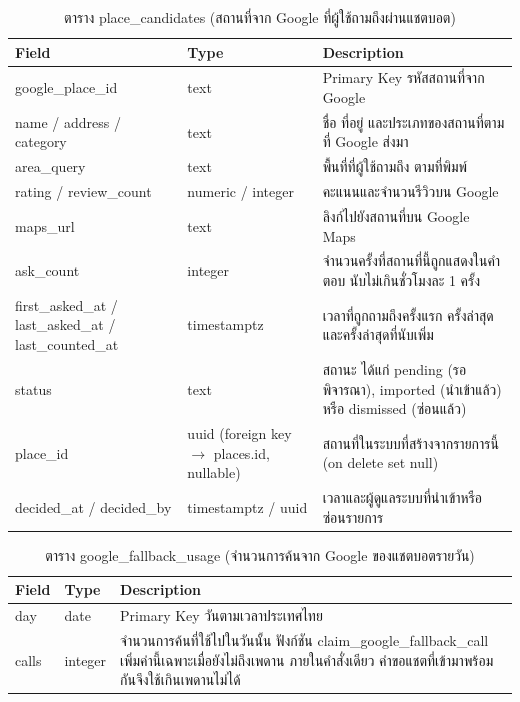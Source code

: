 \begin{table}[H]
\centering
\caption{ตาราง place\_candidates (สถานที่จาก Google ที่ผู้ใช้ถามถึงผ่านแชตบอต)}
\label{tab:db_candidates}
\begin{tabular}{|p{3.6cm}|p{2.6cm}|p{6.8cm}|}
\hline
\textbf{Field} & \textbf{Type} & \textbf{Description} \\
\hline
google\_place\_id & text & Primary Key รหัสสถานที่จาก Google \\ \hline
name / address / category & text & ชื่อ ที่อยู่ และประเภทของสถานที่ตามที่ Google ส่งมา \\ \hline
area\_query & text & พื้นที่ที่ผู้ใช้ถามถึง ตามที่พิมพ์ \\ \hline
rating / review\_count & numeric / integer & คะแนนและจำนวนรีวิวบน Google \\ \hline
maps\_url & text & ลิงก์ไปยังสถานที่บน Google Maps \\ \hline
ask\_count & integer & จำนวนครั้งที่สถานที่นี้ถูกแสดงในคำตอบ นับไม่เกินชั่วโมงละ 1 ครั้ง \\ \hline
first\_asked\_at / last\_asked\_at / last\_counted\_at & timestamptz & เวลาที่ถูกถามถึงครั้งแรก ครั้งล่าสุด และครั้งล่าสุดที่นับเพิ่ม \\ \hline
status & text & สถานะ ได้แก่ pending (รอพิจารณา), imported (นำเข้าแล้ว) หรือ dismissed (ซ่อนแล้ว) \\ \hline
place\_id & uuid (foreign key $\to$ places.id, nullable) & สถานที่ในระบบที่สร้างจากรายการนี้ (on delete set null) \\ \hline
decided\_at / decided\_by & timestamptz / uuid & เวลาและผู้ดูแลระบบที่นำเข้าหรือซ่อนรายการ \\
\hline
\end{tabular}
\end{table}

\begin{table}[H]
\centering
\caption{ตาราง google\_fallback\_usage (จำนวนการค้นจาก Google ของแชตบอตรายวัน)}
\label{tab:db_fallback_usage}
\begin{tabular}{|p{3.6cm}|p{2.6cm}|p{6.8cm}|}
\hline
\textbf{Field} & \textbf{Type} & \textbf{Description} \\
\hline
day & date & Primary Key วันตามเวลาประเทศไทย \\ \hline
calls & integer & จำนวนการค้นที่ใช้ไปในวันนั้น ฟังก์ชัน claim\_google\_fallback\_call เพิ่มค่านี้เฉพาะเมื่อยังไม่ถึงเพดาน ภายในคำสั่งเดียว คำขอแชตที่เข้ามาพร้อมกันจึงใช้เกินเพดานไม่ได้ \\
\hline
\end{tabular}
\end{table}

